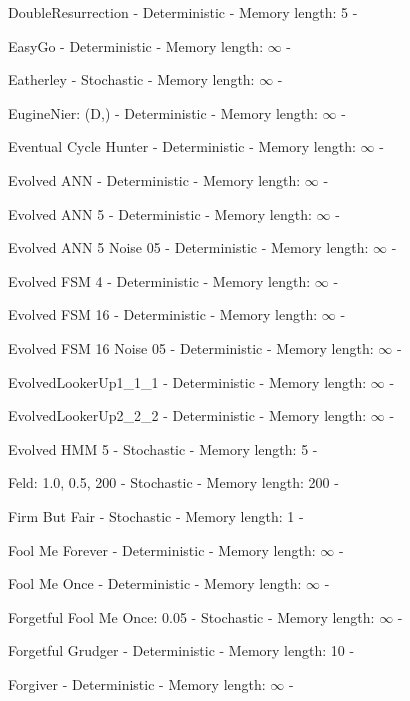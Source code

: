 \item DoubleResurrection - Deterministic - Memory length: 5 - \cite{Eckhart2015}
\item EasyGo - Deterministic - Memory length: \(\infty\) - \cite{Prison1998, Li2011}
\item Eatherley - Stochastic - Memory length: \(\infty\) - \cite{Axelrod1980b}
\item EugineNier: (D,) - Deterministic - Memory length: \(\infty\) - \cite{LessWrong2011}
\item Eventual Cycle Hunter - Deterministic - Memory length: \(\infty\) - \cite{Knight2018}
\item Evolved ANN - Deterministic - Memory length: \(\infty\) - \cite{Knight2018}
\item Evolved ANN 5 - Deterministic - Memory length: \(\infty\) - \cite{Knight2018}
\item Evolved ANN 5 Noise 05 - Deterministic - Memory length: \(\infty\) - \cite{Knight2018}
\item Evolved FSM 4 - Deterministic - Memory length: \(\infty\) - \cite{Knight2018}
\item Evolved FSM 16 - Deterministic - Memory length: \(\infty\) - \cite{Knight2018}
\item Evolved FSM 16 Noise 05 - Deterministic - Memory length: \(\infty\) - \cite{Knight2018}
\item EvolvedLookerUp1\_1\_1 - Deterministic - Memory length: \(\infty\) - \cite{Knight2018}
\item EvolvedLookerUp2\_2\_2 - Deterministic - Memory length: \(\infty\) - \cite{Knight2018}
\item Evolved HMM 5 - Stochastic - Memory length: 5 - \cite{Knight2018}
\item Feld: 1.0, 0.5, 200 - Stochastic - Memory length: 200 - \cite{Axelrod1980}
\item Firm But Fair - Stochastic - Memory length: 1 - \cite{Frean1994}
\item Fool Me Forever - Deterministic - Memory length: \(\infty\) - \cite{Knight2018}
\item Fool Me Once - Deterministic - Memory length: \(\infty\) - \cite{Knight2018}
\item Forgetful Fool Me Once: 0.05 - Stochastic - Memory length: \(\infty\) - \cite{Knight2018}
\item Forgetful Grudger - Deterministic - Memory length: 10 - \cite{Knight2018}
\item Forgiver - Deterministic - Memory length: \(\infty\) - \cite{Knight2018}
